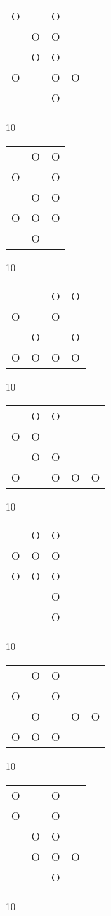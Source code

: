 \begin{tabular}{|m{0.2cm}m{0.2cm}m{0.2cm}m{0.2cm}|}\hline
O& &O& \\
 &O&O& \\
 &O&O& \\
O& &O&O\\
 & &O& \\
\hline\end{tabular}10
\begin{tabular}{|m{0.2cm}m{0.2cm}m{0.2cm}|}\hline
 &O&O\\
O& &O\\
 &O&O\\
O&O&O\\
 &O& \\
\hline\end{tabular}10
\begin{tabular}{|m{0.2cm}m{0.2cm}m{0.2cm}m{0.2cm}|}\hline
 & &O&O\\
O& &O& \\
 &O& &O\\
O&O&O&O\\
\hline\end{tabular}10
\begin{tabular}{|m{0.2cm}m{0.2cm}m{0.2cm}m{0.2cm}m{0.2cm}|}\hline
 &O&O& & \\
O&O& & & \\
 &O&O& & \\
O& &O&O&O\\
\hline\end{tabular}10
\begin{tabular}{|m{0.2cm}m{0.2cm}m{0.2cm}|}\hline
 &O&O\\
O&O&O\\
O&O&O\\
 & &O\\
 & &O\\
\hline\end{tabular}10
\begin{tabular}{|m{0.2cm}m{0.2cm}m{0.2cm}m{0.2cm}m{0.2cm}|}\hline
 &O&O& & \\
O& &O& & \\
 &O& &O&O\\
O&O&O& & \\
\hline\end{tabular}10
\begin{tabular}{|m{0.2cm}m{0.2cm}m{0.2cm}m{0.2cm}|}\hline
O& &O& \\
O& &O& \\
 &O&O& \\
 &O&O&O\\
 & &O& \\
\hline\end{tabular}10
